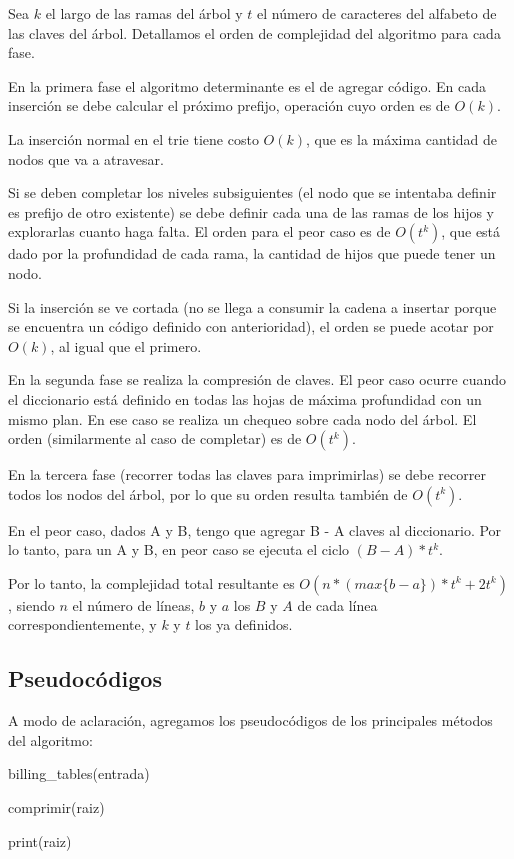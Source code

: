 Sea $k$ el largo de las ramas del árbol y $t$ el número de caracteres del
alfabeto de las claves del árbol. Detallamos el orden de complejidad del
algoritmo para cada fase.

En la primera fase el algoritmo determinante es el de agregar código. En cada
inserción se debe calcular el próximo prefijo, operación cuyo orden es de $O(k)$.

La inserción normal en el trie tiene costo $O(k)$, que es la máxima cantidad
de nodos que va a atravesar.

Si se deben completar los niveles subsiguientes (el nodo que se intentaba
definir es prefijo de otro existente) se debe definir cada una de las ramas
de los hijos y explorarlas cuanto haga falta. El orden para el peor caso es
de $O(t^k)$, que está dado por la profundidad de cada rama, la cantidad
de hijos que puede tener un nodo.

Si la inserción se ve cortada (no se llega a consumir la cadena a insertar
porque se encuentra un código definido con anterioridad), el orden se puede
acotar por $O(k)$, al igual que el primero.

En la segunda fase se realiza la compresión de claves. El peor caso ocurre
cuando el diccionario está definido en todas las hojas de máxima profundidad
con un mismo plan. En ese caso se realiza un chequeo sobre cada nodo del árbol.
El orden (similarmente al caso de completar) es de $O(t^k)$.

En la tercera fase (recorrer todas las claves para imprimirlas) se debe
recorrer todos los nodos del árbol, por lo que su orden resulta también de
$O(t^k)$.

En el peor caso, dados A y B, tengo que agregar B - A claves al diccionario.
Por lo tanto, para un A y B, en peor caso se ejecuta el ciclo $(B-A)*t^k$.

Por lo tanto, la complejidad total resultante es $O(n*(max\{b-a\})*t^k + 2t^k)$, siendo
$n$ el número de líneas, $b$ y $a$ los $B$ y $A$ de cada línea correspondientemente,
y $k$ y $t$ los ya definidos.

\subsection*{Pseudocódigos}

A modo de aclaración, agregamos los pseudocódigos de los principales métodos del algoritmo:

\begin{algorithm}[H]
\linesnumbered
\caption{billing\_tables(entrada)}
\vspace{0.4cm}

comprimir(raiz)

print(raiz)
\end{algorithm}

